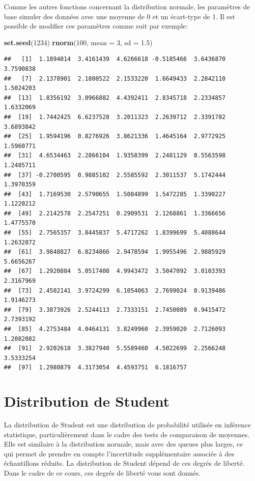 \documentclass[
]{book}
\newenvironment{Shaded}{\begin{snugshade}}{\end{snugshade}}
\newcommand{\AttributeTok}[1]{\textcolor[rgb]{0.13,0.29,0.53}{#1}}
\newcommand{\DecValTok}[1]{\textcolor[rgb]{0.00,0.00,0.81}{#1}}
\newcommand{\FloatTok}[1]{\textcolor[rgb]{0.00,0.00,0.81}{#1}}
\newcommand{\FunctionTok}[1]{\textcolor[rgb]{0.13,0.29,0.53}{\textbf{#1}}}
\newcommand{\NormalTok}[1]{#1}
\begin{document}
Comme les autres fonctions concernant la distribution normale, les paramètres de base simuler des données avec une moyenne de 0 et un écart-type de 1. Il est possible de modifier ces paramètres comme suit par exemple:

\begin{Shaded}
\begin{Highlighting}[]
\FunctionTok{set.seed}\NormalTok{(}\DecValTok{1234}\NormalTok{)  }
\FunctionTok{rnorm}\NormalTok{(}\DecValTok{100}\NormalTok{, }\AttributeTok{mean =} \DecValTok{3}\NormalTok{, }\AttributeTok{sd =} \FloatTok{1.5}\NormalTok{) }
\end{Highlighting}
\end{Shaded}

\begin{verbatim}
##   [1]  1.1894014  3.4161439  4.6266618 -0.5185466  3.6436870  3.7590838
##   [7]  2.1378901  2.1800522  2.1533220  1.6649433  2.2842110  1.5024203
##  [13]  1.8356192  3.0966882  4.4392411  2.8345718  2.2334857  1.6332069
##  [19]  1.7442425  6.6237528  3.2011323  2.2639712  2.3391782  3.6893842
##  [25]  1.9594196  0.8276926  3.8621336  1.4645164  2.9772925  1.5960771
##  [31]  4.6534463  2.2866104  1.9358399  2.2481129  0.5563598  1.2485711
##  [37] -0.2700595  0.9885102  2.5585592  2.3011537  5.1742444  1.3970359
##  [43]  1.7169530  2.5790655  1.5084899  1.5472285  1.3390227  1.1220212
##  [49]  2.2142578  2.2547251  0.2909531  2.1268861  1.3366656  1.4775570
##  [55]  2.7565357  3.8445837  5.4717262  1.8399699  5.4088644  1.2632872
##  [61]  3.9848827  6.8234866  2.9478594  1.9955496  2.9885929  5.6656267
##  [67]  1.2920884  5.0517408  4.9943472  3.5047092  3.0103393  2.3167969
##  [73]  2.4502141  3.9724299  6.1054063  2.7699024  0.9139486  1.9146273
##  [79]  3.3873926  2.5244113  2.7333151  2.7450089  0.9415472  2.7393192
##  [85]  4.2753484  4.0464131  3.8249960  2.3959020  2.7126093  1.2082082
##  [91]  2.9202618  3.3827940  5.5589460  4.5022699  2.2566248  3.5333254
##  [97]  1.2980879  4.3173054  4.4593751  6.1816757
\end{verbatim}

\section{Distribution de Student}\label{distribution-de-student}

La distribution de Student est une distribution de probabilité utilisée en inférence statistique, particulièrement dans le cadre des tests de comparaison de moyennes. Elle est similaire à la distribution normale, mais avec des queues plus larges, ce qui permet de prendre en compte l'incertitude supplémentaire associée à des échantillons réduits. La distribution de Student dépend de ces degrés de liberté. Dans le cadre de ce cours, ces degrés de liberté vous sont donnés.
\end{document}

